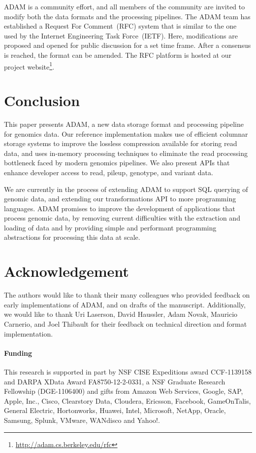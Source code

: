 \documentclass{bioinfo}
\begin{document}
ADAM is a community effort, and all members of the community are invited to modify both the data formats and the processing pipelines. The ADAM team has established a
Request For Comment~(RFC) system that is similar to the one used by the Internet Engineering Task Force~(IETF). Here, modifications are proposed and opened for public
discussion for a set time frame. After a consensus is reached, the format can be amended. The RFC platform is hosted at our project
website\footnote{\url{http://adam.cs.berkeley.edu/rfc}}.

\section{Conclusion}
\label{sec:conclusion}

This paper presents ADAM, a new data storage format and processing pipeline for genomics data. Our reference implementation makes use of efficient columnar storage
systems to improve the lossless compression available for storing read data, and uses in-memory processing techniques to eliminate the read processing bottleneck faced by
modern genomics pipelines. We also present APIs that enhance developer access to read, pileup, genotype, and variant data.

We are currently in the process of extending ADAM to support SQL querying of genomic data, and extending our transformations API to more programming languages. 
ADAM promises to improve the development of applications that process genomic data, by removing current difficulties with the extraction and loading of data and by
providing simple and performant programming abstractions for processing this data at scale.

\section*{Acknowledgement}
\label{sec:acknowledgement}

The authors would like to thank their many colleagues who provided feedback on early implementations of ADAM, and on drafts of the manuscript. Additionally, we would
like to thank Uri Laserson, David Haussler, Adam Novak, Mauricio Carnerio, and Joel Thibault for their feedback on technical direction and format implementation.

\paragraph{Funding\textcolon}
\label{sec:funding}

This research is supported in part by NSF CISE Expeditions award CCF-1139158 and DARPA XData Award FA8750-12-2-0331, a NSF
Graduate Research Fellowship (DGE-1106400) and gifts from Amazon Web Services, Google, SAP,  Apple, Inc., Cisco, Clearstory Data,
Cloudera, Ericsson, Facebook, GameOnTalis, General Electric, Hortonworks, Huawei, Intel, Microsoft, NetApp, Oracle, Samsung, Splunk,
VMware, WANdisco and Yahoo!.




\end{document}
